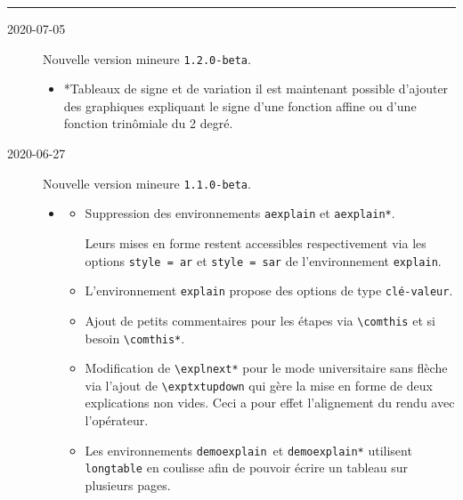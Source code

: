\documentclass[12pt,a4paper]{book}
\makeatletter
\newcommand\env[1]{\texttt{#1}}
\newcommand\macro[1]{\env{\textbackslash{}#1}}
\theoremstyle{definition}
\newcommand\separation{
	\medskip
	\hfill\rule{0.5\textwidth}{0.75pt}\hfill
	\medskip
}
\newcommand\topic{\@ifstar{\@topic@star}{\@topic@no@star}}
\newcommand\@topic@no@star[1]{%
	\textbf{\textsc{#1}.}%
}
\newcommand\@topic@star[1]{%
	\textbf{\textsc{#1} :}%
}
\makeatother
\begin{document}
{{\begin{description}
    
    \separation
\end{description}

\begin{description}    \item[2020-07-05] Nouvelle version mineure \verb+1.2.0-beta+.
    
    \begin{itemize}[itemsep=.5em]
        \item \topic*{Tableaux de signe et de variation}
              il est maintenant possible d'ajouter des graphiques expliquant le signe d'une fonction affine ou d'une fonction trinômiale du 2\ieme{} degré.
    \end{itemize}\end{description}

\begin{description}    \item[2020-06-27] Nouvelle version mineure \verb+1.1.0-beta+.
    
    \begin{itemize}[itemsep=.5em]
        \item \topic{Logique}
        \begin{itemize}[itemsep=.5em]
            \item Suppression des environnements \env{aexplain} et \env{aexplain*}.
    
                  \smallskip
    
                  Leurs mises en forme restent accessibles respectivement via les options \verb+style = ar+ et \verb+style = sar+ de l'environnement \env{explain}.
    
    
            \item L'environnement \env{explain} propose des options de type \texttt{clé-valeur}.
    
    
            \item Ajout de petits commentaires pour les étapes via \macro{comthis} et si besoin \macro{comthis*}.
    
    
            \item Modification de \macro{explnext*} pour le mode universitaire sans flèche via l'ajout de \macro{exptxtupdown} qui gère la mise en forme de deux explications non vides.
                  Ceci a pour effet l'alignement du rendu avec l'opérateur.
    
    
            \item Les environnements \env{demoexplain} et \env{demoexplain*} utilisent \env{longtable} en coulisse afin de pouvoir écrire un tableau sur plusieurs pages.
        \end{itemize}
    \end{itemize}
\end{description}

}}
\end{document}
